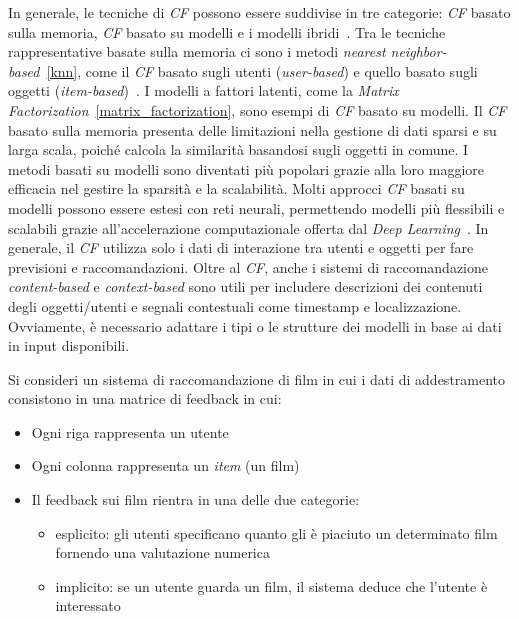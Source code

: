 In generale, le tecniche di \textit{CF} possono essere suddivise in tre categorie: \textit{CF} basato sulla memoria, \textit{CF} basato su modelli e i modelli ibridi~\cite{Su}. Tra le tecniche rappresentative basate sulla memoria ci sono i metodi \textit{nearest neighbor-based}~\ref{knn}, come il \textit{CF} basato sugli utenti (\textit{user-based}) e quello basato sugli oggetti (\textit{item-based})~\cite{Sarwar}. I modelli a fattori latenti, come la \textit{Matrix Factorization}~\ref{matrix_factorization}, sono esempi di \textit{CF} basato su modelli. Il \textit{CF} basato sulla memoria presenta delle limitazioni nella gestione di dati sparsi e su larga scala, poiché calcola la similarità basandosi sugli oggetti in comune. I metodi basati su modelli sono diventati più popolari grazie alla loro maggiore efficacia nel gestire la sparsità e la scalabilità. Molti approcci \textit{CF} basati su modelli possono essere estesi con reti neurali, permettendo modelli più flessibili e scalabili grazie all’accelerazione computazionale offerta dal \textit{Deep Learning}~\cite{Zhang}. In generale, il \textit{CF} utilizza solo i dati di interazione tra utenti e oggetti per fare previsioni e raccomandazioni. Oltre al \textit{CF}, anche i sistemi di raccomandazione \textit{content-based} e \textit{context-based} sono utili per includere descrizioni dei contenuti degli oggetti/utenti e segnali contestuali come timestamp e localizzazione. Ovviamente, è necessario adattare i tipi o le strutture dei modelli in base ai dati in input disponibili.

Si consideri un sistema di raccomandazione di film in cui i dati di addestramento consistono in una matrice di feedback in cui:

\begin{itemize}
    \item Ogni riga rappresenta un utente
    \item Ogni colonna rappresenta un \textit{item} (un film)
    \item Il feedback sui film rientra in una delle due categorie:
    \begin{itemize}
        \item esplicito: gli utenti specificano quanto gli è piaciuto un determinato film fornendo una valutazione numerica
        \item implicito: se un utente guarda un film, il sistema deduce che l'utente è interessato
    \end{itemize}
\end{itemize}

